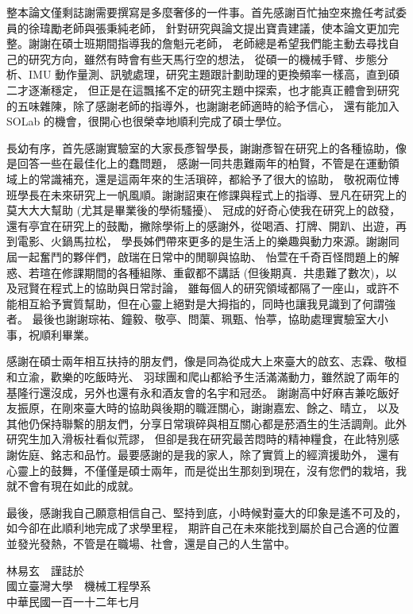 \begin{acknowledgementsCH}
    \fontsize{12pt}{18pt}\selectfont
    整本論文僅剩誌謝需要撰寫是多麼奢侈的一件事。首先感謝百忙抽空來擔任考試委員的徐瑋勵老師與張秉純老師，
    針對研究與論文提出寶貴建議，使本論文更加完整。謝謝在碩士班期間指導我的詹魁元老師，
    老師總是希望我們能主動去尋找自己的研究方向，雖然有時會有些天馬行空的想法，
    從碩一的機械手臂、步態分析、IMU 動作量測、訊號處理，研究主題跟計劃助理的更換頻率一樣高，直到碩二才逐漸穩定，
    但正是在這飄搖不定的研究主題中探索，也才能真正體會到研究的五味雜陳，除了感謝老師的指導外，也謝謝老師適時的給予信心，
    還有能加入 SOLab 的機會，很開心也很榮幸地順利完成了碩士學位。

    長幼有序，首先感謝實驗室的大家長彥智學長，謝謝彥智在研究上的各種協助，像是回答一些在最佳化上的蠢問題，
    感謝一同共患難兩年的柏賢，不管是在運動領域上的常識補充，還是這兩年來的生活瑣碎，都給予了很大的協助，
    敬祝兩位博班學長在未來研究上一帆風順。謝謝詔東在修課與程式上的指導、昱凡在研究上的莫大大大幫助 (尤其是畢業後的學術騷擾)、
    冠成的好奇心使我在研究上的啟發，還有亭宜在研究上的鼓勵，撇除學術上的感謝外，從喝酒、打牌、開趴、出遊，再到電影、火鍋馬拉松，
    學長姊們帶來更多的是生活上的樂趣與動力來源。謝謝同屆一起奮鬥的夥伴們，啟瑞在日常中的閒聊與協助、
    怡萱在千奇百怪問題上的解惑、若瑄在修課期間的各種組隊、重叡都不講話 (但後期真．共患難了數次)，以及冠賢在程式上的協助與日常討論，    
    雖每個人的研究領域都隔了一座山，或許不能相互給予實質幫助，但在心靈上絕對是大拇指的，同時也讓我見識到了何謂強者。
    最後也謝謝琮祐、鐘毅、敬亭、問蕖、珮甄、怡葶，協助處理實驗室大小事，祝順利畢業。

    感謝在碩士兩年相互扶持的朋友們，像是同為從成大上來臺大的啟玄、志霖、敬桓和立渝，歡樂的吃飯時光、
    羽球團和爬山都給予生活滿滿動力，雖然說了兩年的基隆行還沒成，另外也還有永和酒友會的名宇和冠丞。
    謝謝高中好麻吉兼吃飯好友振原，在剛來臺大時的協助與後期的職涯關心，謝謝嘉宏、餘之、晴立，
    以及其他仍保持聯繫的朋友們，分享日常瑣碎與相互關心都是菸酒生的生活調劑。此外研究生加入滑板社看似荒謬，
    但卻是我在研究最苦悶時的精神糧食，在此特別感謝佐庭、銘志和品竹。最要感謝的是我的家人，除了實質上的經濟援助外，
    還有心靈上的鼓舞，不僅僅是碩士兩年，而是從出生那刻到現在，沒有您們的栽培，我就不會有現在如此的成就。

    最後，感謝我自己願意相信自己、堅持到底，小時候對臺大的印象是遙不可及的，如今卻在此順利地完成了求學里程，
    期許自己在未來能找到屬於自己合適的位置並發光發熱，不管是在職場、社會，還是自己的人生當中。

    \begin{flushright}
        林易玄　謹誌於\\
        國立臺灣大學　機械工程學系\\
        中華民國一百一十二年七月
    \end{flushright}
 
\end{acknowledgementsCH}